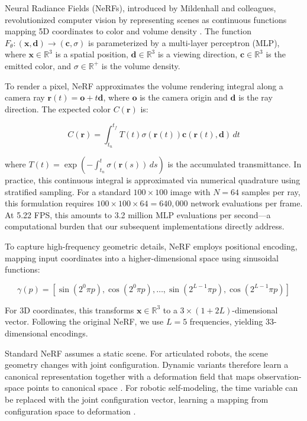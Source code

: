 \documentclass[12pt,a4paper,oneside]{report}
\begin{document}
Neural Radiance Fields (NeRFs), introduced by Mildenhall and colleagues, revolutionized computer vision by representing scenes as continuous functions mapping 5D coordinates to color and volume density \cite{mildenhall2020nerf}. The function $F_\theta: (\mathbf{x}, \mathbf{d}) \rightarrow (\mathbf{c}, \sigma)$ is parameterized by a multi-layer perceptron (MLP), where $\mathbf{x} \in \mathbb{R}^3$ is a spatial position, $\mathbf{d} \in \mathbb{R}^3$ is a viewing direction, $\mathbf{c} \in \mathbb{R}^3$ is the emitted color, and $\sigma \in \mathbb{R}^+$ is the volume density.

To render a pixel, NeRF approximates the volume rendering integral along a camera ray $\mathbf{r}(t) = \mathbf{o} + t\mathbf{d}$, where $\mathbf{o}$ is the camera origin and $\mathbf{d}$ is the ray direction. The expected color $C(\mathbf{r})$ is:

\begin{equation}
C(\mathbf{r}) = \int_{t_n}^{t_f} T(t) \sigma(\mathbf{r}(t)) \mathbf{c}(\mathbf{r}(t), \mathbf{d}) \, dt
\end{equation}

where $T(t) = \exp\left(-\int_{t_n}^{t} \sigma(\mathbf{r}(s)) \, ds\right)$ is the accumulated transmittance. In practice, this continuous integral is approximated via numerical quadrature using stratified sampling. For a standard $100 \times 100$ image with $N = 64$ samples per ray, this formulation requires $100 \times 100 \times 64 = 640,000$ network evaluations per frame. At 5.22 FPS, this amounts to 3.2 million MLP evaluations per second---a computational burden that our subsequent implementations directly address.

To capture high-frequency geometric details, NeRF employs positional encoding, mapping input coordinates into a higher-dimensional space using sinusoidal functions:

\begin{equation}
\gamma(p) = [\sin(2^0 \pi p), \cos(2^0 \pi p), \ldots, \sin(2^{L-1} \pi p), \cos(2^{L-1} \pi p)]
\end{equation}

For 3D coordinates, this transforms $\mathbf{x} \in \mathbb{R}^3$ to a $3 \times (1 + 2L)$-dimensional vector. Following the original NeRF, we use $L = 5$ frequencies, yielding 33-dimensional encodings.

Standard NeRF assumes a static scene. For articulated robots, the scene geometry changes with joint configuration. Dynamic variants therefore learn a canonical representation together with a deformation field that maps observation-space points to canonical space \cite{pumarola2021d, park2021nerfies}. For robotic self-modeling, the time variable can be replaced with the joint configuration vector, learning a mapping from configuration space to deformation \cite{hu2024teaching}.
\end{document}
